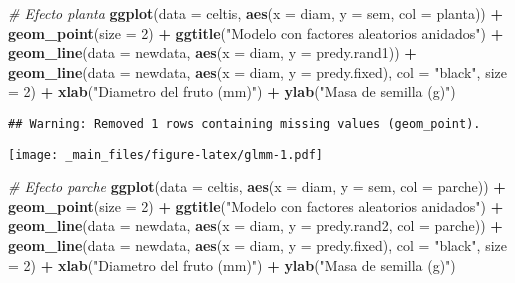 \documentclass[
]{book}
\newenvironment{Shaded}{\begin{snugshade}}{\end{snugshade}}
\newcommand{\CommentTok}[1]{\textcolor[rgb]{0.56,0.35,0.01}{\textit{#1}}}
\newcommand{\DataTypeTok}[1]{\textcolor[rgb]{0.13,0.29,0.53}{#1}}
\newcommand{\DecValTok}[1]{\textcolor[rgb]{0.00,0.00,0.81}{#1}}
\newcommand{\KeywordTok}[1]{\textcolor[rgb]{0.13,0.29,0.53}{\textbf{#1}}}
\newcommand{\NormalTok}[1]{#1}
\newcommand{\OperatorTok}[1]{\textcolor[rgb]{0.81,0.36,0.00}{\textbf{#1}}}
\newcommand{\StringTok}[1]{\textcolor[rgb]{0.31,0.60,0.02}{#1}}
\begin{document}
\begin{Shaded}
\begin{Highlighting}[]
\CommentTok{# Efecto planta}
\KeywordTok{ggplot}\NormalTok{(}\DataTypeTok{data =}\NormalTok{ celtis, }\KeywordTok{aes}\NormalTok{(}\DataTypeTok{x =}\NormalTok{ diam, }\DataTypeTok{y =}\NormalTok{ sem, }\DataTypeTok{col =}\NormalTok{ planta)) }\OperatorTok{+}
\StringTok{  }\KeywordTok{geom_point}\NormalTok{(}\DataTypeTok{size =} \DecValTok{2}\NormalTok{) }\OperatorTok{+}\StringTok{ }
\StringTok{  }\KeywordTok{ggtitle}\NormalTok{(}\StringTok{"Modelo con factores aleatorios anidados"}\NormalTok{) }\OperatorTok{+}
\StringTok{  }\KeywordTok{geom_line}\NormalTok{(}\DataTypeTok{data =}\NormalTok{ newdata, }\KeywordTok{aes}\NormalTok{(}\DataTypeTok{x =}\NormalTok{ diam, }\DataTypeTok{y =}\NormalTok{ predy.rand1)) }\OperatorTok{+}
\StringTok{  }\KeywordTok{geom_line}\NormalTok{(}\DataTypeTok{data =}\NormalTok{ newdata, }\KeywordTok{aes}\NormalTok{(}\DataTypeTok{x =}\NormalTok{ diam, }\DataTypeTok{y =}\NormalTok{ predy.fixed), }\DataTypeTok{col =} \StringTok{"black"}\NormalTok{, }\DataTypeTok{size =} \DecValTok{2}\NormalTok{) }\OperatorTok{+}
\StringTok{  }\KeywordTok{xlab}\NormalTok{(}\StringTok{"Diametro del fruto (mm)"}\NormalTok{) }\OperatorTok{+}\StringTok{ }\KeywordTok{ylab}\NormalTok{(}\StringTok{"Masa de semilla (g)"}\NormalTok{)}
\end{Highlighting}
\end{Shaded}

\begin{verbatim}
## Warning: Removed 1 rows containing missing values (geom_point).
\end{verbatim}

\texttt{[image: \_main\_files/figure-latex/glmm-1.pdf]}

\begin{Shaded}
\begin{Highlighting}[]
\CommentTok{# Efecto parche}
\KeywordTok{ggplot}\NormalTok{(}\DataTypeTok{data =}\NormalTok{ celtis, }\KeywordTok{aes}\NormalTok{(}\DataTypeTok{x =}\NormalTok{ diam, }\DataTypeTok{y =}\NormalTok{ sem, }\DataTypeTok{col =}\NormalTok{ parche)) }\OperatorTok{+}
\StringTok{  }\KeywordTok{geom_point}\NormalTok{(}\DataTypeTok{size =} \DecValTok{2}\NormalTok{) }\OperatorTok{+}\StringTok{ }
\StringTok{  }\KeywordTok{ggtitle}\NormalTok{(}\StringTok{"Modelo con factores aleatorios anidados"}\NormalTok{) }\OperatorTok{+}
\StringTok{  }\KeywordTok{geom_line}\NormalTok{(}\DataTypeTok{data =}\NormalTok{ newdata, }\KeywordTok{aes}\NormalTok{(}\DataTypeTok{x =}\NormalTok{ diam, }\DataTypeTok{y =}\NormalTok{ predy.rand2, }\DataTypeTok{col =}\NormalTok{ parche)) }\OperatorTok{+}
\StringTok{  }\KeywordTok{geom_line}\NormalTok{(}\DataTypeTok{data =}\NormalTok{ newdata, }\KeywordTok{aes}\NormalTok{(}\DataTypeTok{x =}\NormalTok{ diam, }\DataTypeTok{y =}\NormalTok{ predy.fixed), }\DataTypeTok{col =} \StringTok{"black"}\NormalTok{, }\DataTypeTok{size =} \DecValTok{2}\NormalTok{) }\OperatorTok{+}
\StringTok{  }\KeywordTok{xlab}\NormalTok{(}\StringTok{"Diametro del fruto (mm)"}\NormalTok{) }\OperatorTok{+}\StringTok{ }\KeywordTok{ylab}\NormalTok{(}\StringTok{"Masa de semilla (g)"}\NormalTok{)}
\end{Highlighting}
\end{Shaded}
\end{document}
